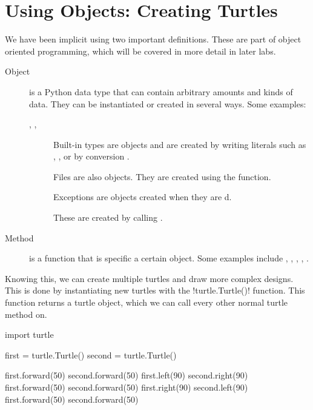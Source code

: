 \documentclass[11pt]{cselabheader}
\begin{document}
\section{Using Objects: Creating Turtles}
We have been implicit using two important definitions. These are part of object
oriented programming, which will be covered in more detail in later labs.
\begin{description}
  \item[Object] is a Python data type that can contain arbitrary amounts and
  kinds of data. They can be instantiated or created in several ways. Some
  examples:

  \begin{description}
    \item[, , ] Built-in
    types are objects and are created by writing literals such as
    , , \pythoninline{[1,2,3]} or by
    conversion .
    \item[] Files are also objects. They are created using
    the  function.
    \item[] Exceptions are objects created when they
    are d.
    \item[] These are created by calling
    .
  \end{description}
  \item[Method] is a function that is specific a certain object. Some examples
  include , ,
  , ,
  .
\end{description}

Knowing this, we can create multiple turtles and draw more complex designs.
This is done by instantiating new turtles with the
\pythoninline!turtle.Turtle()! function. This function returns a turtle
object, which we can call every other normal turtle method on.

\begin{python3code}
import turtle

first = turtle.Turtle()
second = turtle.Turtle()

first.forward(50)
second.forward(50)
first.left(90)
second.right(90)
first.forward(50)
second.forward(50)
first.right(90)
second.left(90)
first.forward(50)
second.forward(50)
\end{python3code}
\end{document}
